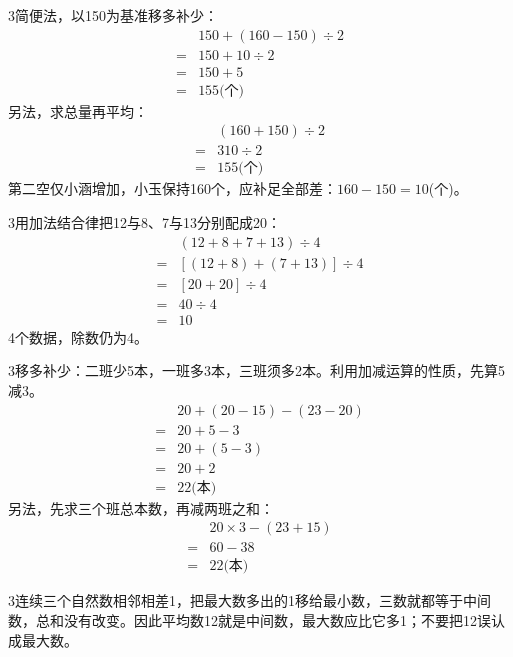 \documentclass[multi=snippet,border={5bp 20bp 5bp 5bp}]{standalone}
\newenvironment{snippet}[3]{\begin{minipage}{#1bp}\color{answerred}\fontsize{#2}{#3}\selectfont\raggedright}{\end{minipage}}
\begin{document}
\begin{snippet}{505}{11.5}{14}\begin{multicols}{3}\raggedcolumns 简便法，以150为基准移多补少：\[\begin{aligned}&150+(160-150)\div2\\={}&150+10\div2\\={}&150+5\\={}&155\text{(个)}\end{aligned}\]另法，求总量再平均：\[\begin{aligned}&(160+150)\div2\\={}&310\div2\\={}&155\text{(个)}\end{aligned}\]第二空仅小涵增加，小玉保持160个，应补足全部差：\(160-150=10\)\allowbreak (个)。\end{multicols}\end{snippet}
\begin{snippet}{505}{11.5}{14}\begin{multicols}{3}\raggedcolumns 用加法结合律把12与8、7与13分别配成20：\[\begin{aligned}&(12+8+7+13)\div4\\={}&[(12+8)+(7+13)]\div4\\={}&[20+20]\div4\\={}&40\div4\\={}&10\end{aligned}\]4个数据，除数仍为4。\end{multicols}\end{snippet}
\begin{snippet}{505}{11.5}{14}\begin{multicols}{3}\raggedcolumns 移多补少：二班少5本，一班多3本，三班须多2本。利用加减运算的性质，先算5减3。\[\begin{aligned}&20+(20-15)-(23-20)\\={}&20+5-3\\={}&20+(5-3)\\={}&20+2\\={}&22\text{(本)}\end{aligned}\]另法，先求三个班总本数，再减两班之和：\[\begin{aligned}&20\times3-(23+15)\\={}&60-38\\={}&22\text{(本)}\end{aligned}\]\end{multicols}\end{snippet}
\begin{snippet}{505}{11.5}{14}\begin{multicols}{3}\raggedcolumns 连续三个自然数相邻相差1，把最大数多出的1移给最小数，三数就都等于中间数，总和没有改变。因此平均数12就是中间数，最大数应比它多1；不要把12误认成最大数。\end{multicols}\end{snippet}
\end{document}
